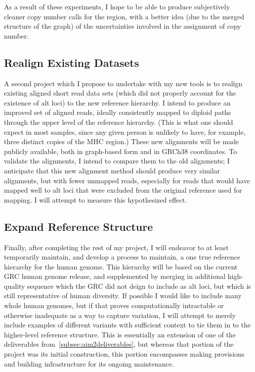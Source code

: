 \documentclass[11pt,proposal]{ucthesis}
\begin{document}
As a result of these experiments, I hope to be able to produce subjectively cleaner copy number calls for the region, with a better idea (due to the merged structure of the graph) of the uncertainties involved in the assignment of copy number.

\subsection{Realign Existing Datasets}
\label{subsec:aim3realign}

A second project which I propose to undertake with my new tools is to realign existing aligned short read data sets (which did not properly account for the existence of alt loci) to the new reference hierarchy. I intend to produce an improved set of aligned reads, ideally consistently mapped to diploid paths through the upper level of the reference hierarchy. (This is what one should expect in most samples, since any given person is unlikely to have, for example, three distinct copies of the MHC region.) These new alignments will be made publicly available, both in graph-based form and in GRCh38 coordinates. To validate the alignments, I intend to compare them to the old alignments; I anticipate that this new alignment method should produce very similar alignments, but with fewer unmapped reads, especially for reads that would have mapped well to alt loci that were excluded from the original reference used for mapping. I will attempt to measure this hypothesized effect.

\subsection{Expand Reference Structure}
\label{subsec:aim3maintenance}

Finally, after completing the rest of my project, I will endeavor to at least temporarily maintain, and develop a process to maintain, a one true reference hierarchy for the human genome. This hierarchy will be based on the current GRC human genome release, and supplemented by merging in additional high-quality sequence which the GRC did not deign to include as alt loci, but which is still representative of human diversity. If possible I would like to include many whole human genomes, but if that proves computationally intractable or otherwise inadequate as a way to capture variation, I will attempt to merely include examples of different variants with sufficient context to tie them in to the higher-level reference structure. This is essentially an extension of one of the deliverables from~\ref{subsec:aim2deliverables}, but whereas that portion of the project was its initial construction, this portion encompasses making provisions and building infrastructure for its ongoing maintenance.
\end{document}
